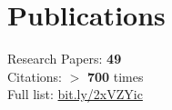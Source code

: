 \documentclass[]{junhu_resume}
\begin{document}
\begin{minipage}[t]{0.3\textwidth}
\section{Publications} 
Research Papers: \textbf{49}\\
Citations: $>$ \textbf{700} times\\
Full list: \href{https://scholar.google.com/citations?user=Vr8dYJsAAAAJ}{bit.ly/2xVZYic}
\sectionsep










\end{minipage}
\end{document}

